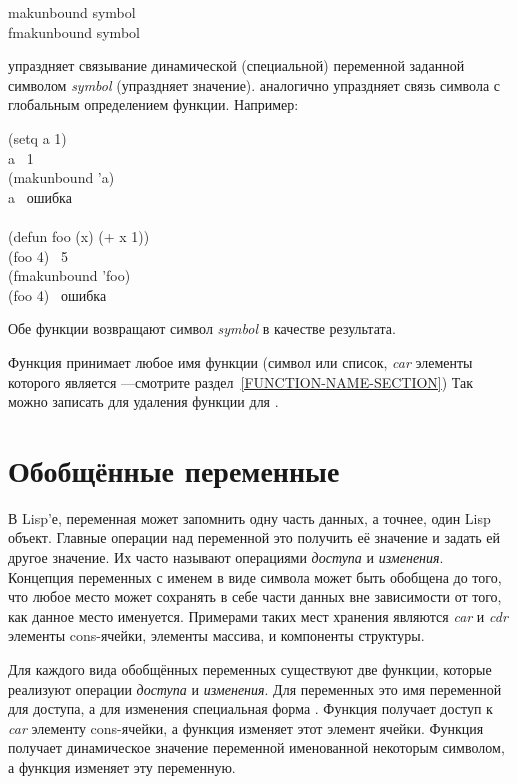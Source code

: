 \begin{defun}[Функция]
makunbound symbol \\
fmakunbound symbol

 упраздняет связывание динамической (специальной) переменной
заданной символом \emph{symbol} (упраздняет значение). 
аналогично упраздняет связь символа с глобальным определением функции.
Например:
\begin{lisp}
(setq a 1) \\
a \EV\ 1 \\
(makunbound 'a) \\
a \EV\ \textrm{ошибка} \\
\\
(defun foo (x) (+ x 1)) \\
(foo 4) \EV\ 5 \\
(fmakunbound 'foo) \\
(foo 4) \EV\ \textrm{ошибка}
\end{lisp}
Обе функции возвращают символ \emph{symbol} в качестве результата.

Функция 
принимает любое имя функции (символ или список,
\emph{car} элементы которого является ---смотрите раздел~\ref{FUNCTION-NAME-SECTION})
Так можно записать  для удаления функции
 для .
\end{defun}

\section{Обобщённые переменные}
\label{SETF-SECTION}

В Lisp'е, переменная может запомнить одну часть данных, а точнее, один Lisp
объект. 
Главные операции над переменной это получить её значение и задать ей другое
значение. Их часто называют операциями \emph{доступа} и
\emph{изменения}. Концепция переменных с именем в виде символа может быть
обобщена до того, что любое место может сохранять в себе части данных вне
зависимости от того, как данное место именуется. Примерами таких мест хранения
являются \emph{car} и \emph{cdr} элементы cons-ячейки, элементы массива, и
компоненты структуры.

Для каждого вида обобщённых переменных существуют две функции, которые реализуют
операции \emph{доступа} и \emph{изменения}.
Для переменных это имя переменной для доступа, а для изменения специальная форма .
Функция  получает доступ к \emph{car} элементу cons-ячейки, а функция
 изменяет этот элемент ячейки.
Функция  получает динамическое значение переменной именованной
некоторым символом, а функция  изменяет эту переменную.

